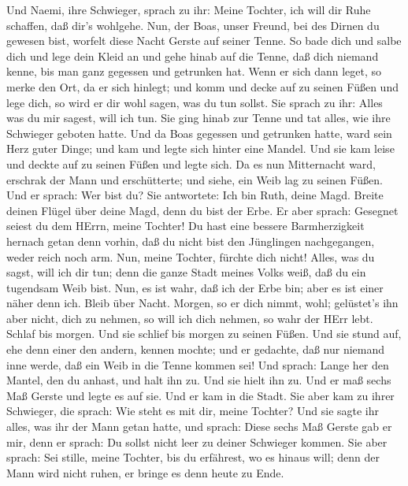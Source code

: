  Und Naemi, ihre Schwieger, sprach zu ihr: Meine Tochter,
ich will dir Ruhe schaffen, daß dir's wohlgehe.  Nun, der
Boas, unser Freund, bei des Dirnen du gewesen bist, worfelt diese Nacht
Gerste auf seiner Tenne.  So bade dich und salbe dich und
lege dein Kleid an und gehe hinab auf die Tenne, daß dich niemand kenne,
bis man ganz gegessen und getrunken hat.  Wenn er sich dann
leget, so merke den Ort, da er sich hinlegt; und komm und decke auf zu
seinen Füßen und lege dich, so wird er dir wohl sagen, was du tun
sollst.  Sie sprach zu ihr: Alles was du mir sagest, will
ich tun.  Sie ging hinab zur Tenne und tat alles, wie ihre
Schwieger geboten hatte.  Und da Boas gegessen und getrunken
hatte, ward sein Herz guter Dinge; und kam und legte sich hinter eine
Mandel. Und sie kam leise und deckte auf zu seinen Füßen und legte sich.
 Da es nun Mitternacht ward, erschrak der Mann und
erschütterte; und siehe, ein Weib lag zu seinen Füßen.  Und
er sprach: Wer bist du? Sie antwortete: Ich bin Ruth, deine Magd. Breite
deinen Flügel über deine Magd, denn du bist der Erbe.  Er
aber sprach: Gesegnet seiest du dem HErrn, meine Tochter! Du hast eine
bessere Barmherzigkeit hernach getan denn vorhin, daß du nicht bist den
Jünglingen nachgegangen, weder reich noch arm.  Nun, meine
Tochter, fürchte dich nicht! Alles, was du sagst, will ich dir tun; denn
die ganze Stadt meines Volks weiß, daß du ein tugendsam Weib bist.
 Nun, es ist wahr, daß ich der Erbe bin; aber es ist einer
näher denn ich.  Bleib über Nacht. Morgen, so er dich
nimmt, wohl; gelüstet's ihn aber nicht, dich zu nehmen, so will ich dich
nehmen, so wahr der HErr lebt. Schlaf bis morgen.  Und sie
schlief bis morgen zu seinen Füßen. Und sie stund auf, ehe denn einer
den andern, kennen mochte; und er gedachte, daß nur niemand inne werde,
daß ein Weib in die Tenne kommen sei!  Und sprach: Lange
her den Mantel, den du anhast, und halt ihn zu. Und sie hielt ihn zu.
Und er maß sechs Maß Gerste und legte es auf sie. Und er kam in die
Stadt.  Sie aber kam zu ihrer Schwieger, die sprach: Wie
steht es mit dir, meine Tochter? Und sie sagte ihr alles, was ihr der
Mann getan hatte,  und sprach: Diese sechs Maß Gerste gab
er mir, denn er sprach: Du sollst nicht leer zu deiner Schwieger kommen.
 Sie aber sprach: Sei stille, meine Tochter, bis du
erfährest, wo es hinaus will; denn der Mann wird nicht ruhen, er bringe
es denn heute zu Ende.

